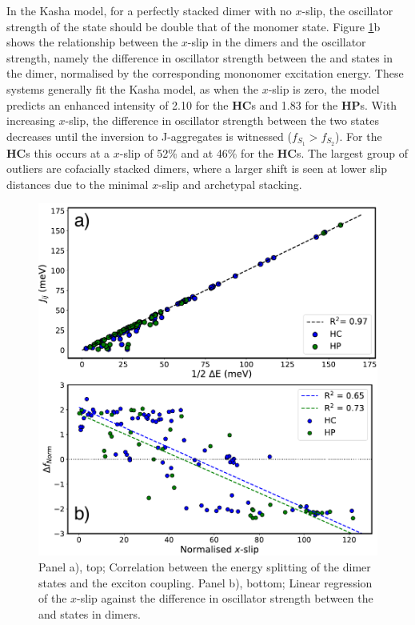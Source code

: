 In the Kasha model, for a perfectly stacked dimer with no $x$-slip, the oscillator strength of the \stwo{} state should be double that of the monomer state. Figure \ref{figure: dimer_regressions}b shows the relationship between the $x$-slip in the dimers and the oscillator strength, namely the difference in oscillator strength between the \stwo{} and \sone{} states in the dimer, normalised by the corresponding mononomer excitation energy. These systems generally fit the Kasha model, as when the $x$-slip is zero, the model predicts an enhanced \stwo{} intensity of 2.10 for the \textbf{HC}s and 1.83 for the \textbf{HP}s. With increasing $x$-slip, the difference in oscillator strength between the two states decreases until the inversion to J-aggregates is witnessed ($f_{S_{1}}>f_{S_{2}}$). For the \textbf{HC}s this occurs at a $x$-slip of 52\% and at 46\% for the \textbf{HC}s. The largest group of outliers are cofacially stacked dimers, where a larger shift is seen at lower slip distances due to the minimal $x$-slip and archetypal stacking.\cite{Gierschner2016} 
\begin{figure}[t]
\centering
  \includegraphics[width=0.8\linewidth]{5ConnectingCrystalStructure/dimer_regressions.pdf}
  \caption[Correlation between the energy splitting and exciton coupling]{Panel a), top; Correlation between the energy splitting of the dimer states and the exciton coupling. Panel b), bottom; Linear regression of the $x$-slip against the difference in oscillator strength between the \stwo{} and \sone{} states in dimers.}
  \label{figure: dimer_regressions}
\end{figure}




